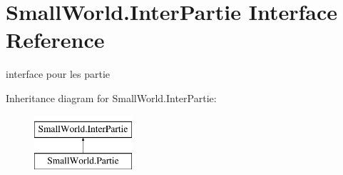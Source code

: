 \hypertarget{interface_small_world_1_1_inter_partie}{\section{Small\-World.\-Inter\-Partie Interface Reference}
\label{interface_small_world_1_1_inter_partie}
}


interface pour les partie  


Inheritance diagram for Small\-World.\-Inter\-Partie\-:\begin{figure}[H]
\begin{center}
\leavevmode
\includegraphics[height=2.000000cm]{interface_small_world_1_1_inter_partie}
\end{center}
\end{figure}
